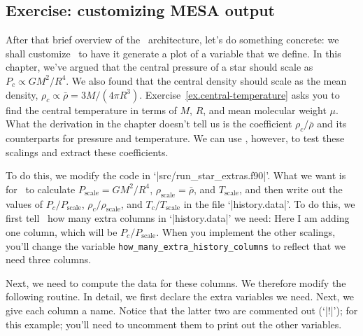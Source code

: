 \subsection{Exercise: customizing MESA output}

After that brief overview of the \mesa\ architecture, let's do something concrete: we shall customize \mesa\ to have it generate a plot of a variable that we define.  In this chapter, we've argued that the central pressure of a star should scale as $P_{c}\propto GM^{2}/R^{4}$. We also found that the central density should scale as the mean density, $\rho_{c}\propto \bar{\rho} = 3M/(4\pi R^{3})$. Exercise~\ref{ex.central-temperature} asks you to find the central temperature in terms of $M$, $R$, and mean molecular weight $\mu$. What the derivation in the chapter doesn't tell us is the coefficient $\rho_{c}/\bar{\rho}$ and its counterparts for pressure and temperature.  We can use \mesa, however, to test these scalings and extract these coefficients.

To do this, we modify the code in `|src/run_star_extras.f90|'.  What we want is for \mesa\ to calculate $P_{\mathrm{scale}} = GM^{2}/R^{4}$, $\rho_{\mathrm{scale}} = \bar{\rho}$, and $T_{\mathrm{scale}}$, and then write out the values of $P_{c}/P_{\mathrm{scale}}$, $\rho_{c}/\rho_{\mathrm{scale}}$, and $T_{c}/T_{\mathrm{scale}}$ in the file `|history.data|'. To do this, we first tell \mesa\ how many extra columns in `|history.data|' we need:
Here I am adding one column, which will be $P_{c}/P_{\mathrm{scale}}$.  When you implement the other scalings, you'll change the variable \verb|how_many_extra_history_columns| to reflect that we need three columns.

Next, we need to compute the data for these columns.  We therefore modify the following routine.
In detail, we first declare the extra variables we need.
Next, we give each column a name.
Notice that the latter two are commented out (`|!|'); for this example; you'll need to uncomment them to print out the other variables.

